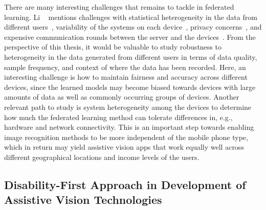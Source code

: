 There are many interesting challenges that remains to tackle in federated learning. Li \etal~\cite{li2020federated} mentions challenges with statistical heterogeneity in the data from different users~\cite{smith2017federated, zhao2018federated}, %
variability of the systems on each device~\cite{bonawitz2019towards}, 
privacy concerns~\cite{geyer2017differentially}, %
and expensive communication rounds between the server and the devices~\cite{konevcny2016federated}. 
From the perspective of this thesis, it would be valuable to study robustness to heterogeneity in the data generated from different users in terms of data quality, sample frequency, and context of where the data has been recorded. 
Here, an interesting challenge is how to maintain fairness and accuracy across different devices, since the learned models may become biased towards devices with large amounts of data as well as commonly occurring groups of devices. 
Another relevant path to study is system heterogeneity among the devices to determine how much the federated learning method can tolerate differences in, e.g., hardware and network connectivity. This is an important step towards enabling image recognition methods to be more independent of the mobile phone type, which in return may yield assistive vision apps that work equally well across different geographical locations and income levels of the users. 



\subsection{Disability-First Approach in Development of Assistive Vision Technologies}

